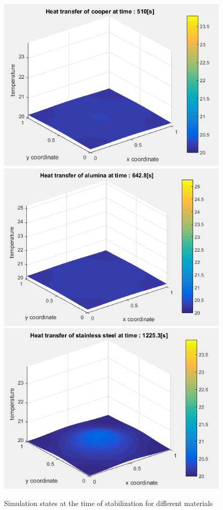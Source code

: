 \documentclass[a4paper,12pt]{article}
\begin{document}
\begin{figure}[H]
\includegraphics[scale=0.55]{2_cooper}
\includegraphics[scale=0.55]{2_alumina}
\includegraphics[scale=0.55]{2_steel}
\caption{Simulation states at the time of stabilization for different materials}
\centering
\end{figure}
\end{document}

